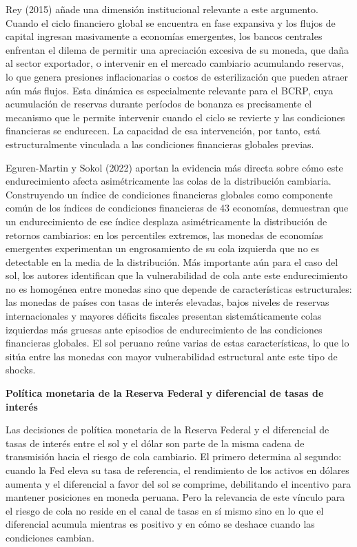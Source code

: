 ﻿\documentclass[11pt,a4paper]{article}
\begin{document}
Rey (2015) añade una dimensión institucional relevante a este argumento. Cuando el ciclo financiero global se encuentra en fase expansiva y los flujos de capital ingresan masivamente a economías emergentes, los bancos centrales enfrentan el dilema de permitir una apreciación excesiva de su moneda, que daña al sector exportador, o intervenir en el mercado cambiario acumulando reservas, lo que genera presiones inflacionarias o costos de esterilización que pueden atraer aún más flujos. Esta dinámica es especialmente relevante para el BCRP, cuya acumulación de reservas durante períodos de bonanza es precisamente el mecanismo que le permite intervenir cuando el ciclo se revierte y las condiciones financieras se endurecen. La capacidad de esa intervención, por tanto, está estructuralmente vinculada a las condiciones financieras globales previas.

Eguren-Martin y Sokol (2022) aportan la evidencia más directa sobre cómo este endurecimiento afecta asimétricamente las colas de la distribución cambiaria. Construyendo un índice de condiciones financieras globales como componente común de los índices de condiciones financieras de 43 economías, demuestran que un endurecimiento de ese índice desplaza asimétricamente la distribución de retornos cambiarios: en los percentiles extremos, las monedas de economías emergentes experimentan un engrosamiento de su cola izquierda que no es detectable en la media de la distribución. Más importante aún para el caso del sol, los autores identifican que la vulnerabilidad de cola ante este endurecimiento no es homogénea entre monedas sino que depende de características estructurales: las monedas de países con tasas de interés elevadas, bajos niveles de reservas internacionales y mayores déficits fiscales presentan sistemáticamente colas izquierdas más gruesas ante episodios de endurecimiento de las condiciones financieras globales. El sol peruano reúne varias de estas características, lo que lo sitúa entre las monedas con mayor vulnerabilidad estructural ante este tipo de shocks.

\textbf{Política monetaria de la Reserva Federal y diferencial de tasas de interés}

Las decisiones de política monetaria de la Reserva Federal y el diferencial de tasas de interés entre el sol y el dólar son parte de la misma cadena de transmisión hacia el riesgo de cola cambiario. El primero determina al segundo: cuando la Fed eleva su tasa de referencia, el rendimiento de los activos en dólares aumenta y el diferencial a favor del sol se comprime, debilitando el incentivo para mantener posiciones en moneda peruana. Pero la relevancia de este vínculo para el riesgo de cola no reside en el canal de tasas en sí mismo sino en lo que el diferencial acumula mientras es positivo y en cómo se deshace cuando las condiciones cambian.
\end{document}
